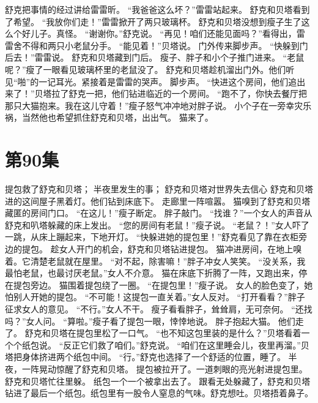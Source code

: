 \documentclass[a4paper,12pt,UTF8,twoside]{ctexbook}
\begin{document}
        舒克把事情的经过讲给雷雷昕。 
        “我爸爸这么坏？”雷雷站起来。 
        舒克和贝塔看到了希望。 
        “我放你们走！”雷雷掀开了两只玻璃杯。 
        舒克和贝塔没想到瘦子生了这么个好儿子。真怪。 
        “谢谢你。”舒克说。 
        “再见！咱们还能见面吗？”看得出，雷雷舍不得和两只小老鼠分手。 
        “能见着！”贝塔说。 
        门外传来脚步声。 
        “快躲到门后去！”雷雷说。 
        舒克和贝塔藏到门后。 
        瘦子、胖子和小个子推门进来。 
        “老鼠呢？”瘦了一眼看见玻璃杯里的老鼠没了。 
        舒克和贝塔趁机溜出门外。他们听见“啪”的一记耳光。紧接着是雷雷的哭声。 
        脚步声。 
        “快进这个房间，他们追出来了！”贝塔拉了舒克一把，他们钻进临近的一个房间。 
        “跑不了，你快去餐厅把那只大猫抱来。我在这儿守着！”瘦子怒气冲冲地对胖子说。 
        小个子在一旁幸灾乐祸，当然他也希望抓住舒克和贝塔，出出气。 
        猫来了。   \chapter{第90集} 
        提包救了舒克和贝塔； 
        半夜里发生的事； 
        舒克和贝塔对世界失去信心   
        舒克和贝塔进的这间屋子黑着灯。他们钻到床底下。 
        走廊里一阵喧嚣。 
        猫嗅到了舒克和贝塔藏匿的房间门口。 
        “在这儿！”瘦子断定。 
        胖子敲门。 
        “找谁？”一个女人的声音从舒克和叭塔躲藏的床上发出。 
        “您的房间有老鼠！”瘦子说。 
        “老鼠？！”女人吓了一跳，从床上蹦起来，下地开灯。 
        “快躲进她的提包里！”舒克看见了靠在衣柜旁边的提包。 
        趁女人开门的机会，舒克和贝塔钻进提包。 
        猫冲进房间，在地上嗅着。它清楚老鼠就在屋里。 
        “对不起，除害嘛！”胖子冲女人笑笑。 
        “没关系，我最怕老鼠，也最讨厌老鼠。”女人不介意。 
        猫在床底下折腾了一阵，又跑出来，停在提包旁边。 
        猫围着提包绕了一圈。 
        “在提包里！”瘦子说。 
        女人的脸色变了，她怕别人开她的提包。 
        “不可能！这提包一直关着。”女人反对。 
        “打开看看？”胖子征求女人的意见。 
        “不行。”女人不干。 
        瘦子看看胖子，耸耸肩，无可奈何。 
        “还找吗？”女人问。 
        “算啦。”瘦子看了提包一眼，悻悻地说。 
        胖子抱起大猫。 
        他们走了。 
        舒克和贝塔在提包里松了一口气。 
        “也不知这包里装的是什么？”贝塔看着一个个纸包说。 
        “反正它们救了咱们。”舒克说。 
        “咱们在这里睡会儿，夜里再溜。”贝塔把身体挤进两个纸包中间。 
        “行。”舒克也选择了一个舒适的位置，睡了。 
        半夜，一阵晃动惊醒了舒克和贝塔。 
        提包被拉开了。一道刺眼的亮光射进提包里。 
        舒克和贝塔忙往里躲。 
        纸包一个一个被拿出去了。 
        跟看无处躲藏了，舒克和贝塔钻进了最后一个纸包。纸包里有一股令人窒息的气味。舒克想吐。贝塔捂着鼻子。 
\end{document}
